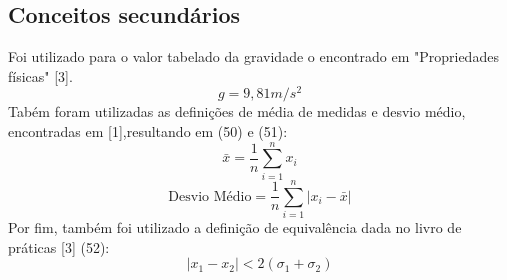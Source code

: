\documentclass[12pt, letterpaper]{article}
\begin{document}
\subsection{Conceitos secundários}
Foi utilizado para o valor tabelado da gravidade o encontrado em "Propriedades físicas" [3].
\begin{equation}
g = 9,81 m/s^2
\end{equation}
Tabém foram utilizadas as definições de média de medidas e desvio médio, encontradas em [1],resultando em (50) e (51):
\begin{equation}
    \bar{x} = \frac{1}{n}\sum_{i=1}^{n} x_i
\end{equation}
\begin{equation}
    \text{Desvio Médio} = \frac{1}{n}\sum_{i=1}^{n} |x_i - \bar{x}|
\end{equation}
Por fim, também foi utilizado a definição de equivalência dada no livro de práticas [3] (52):
\begin{equation}
    |x_1 - x_2| < 2(\sigma_1 + \sigma_2)
\end{equation}
\end{document}
